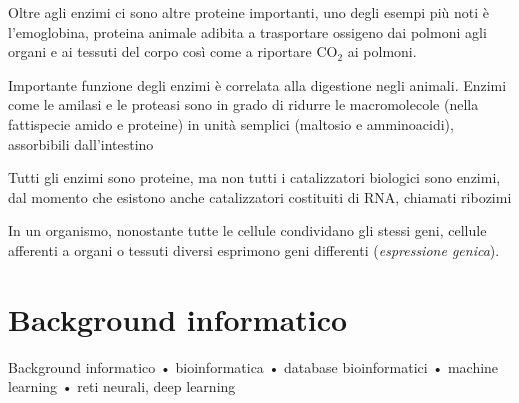 \par Oltre agli enzimi ci sono altre proteine importanti, uno degli esempi più noti è l'emoglobina, proteina animale adibita a trasportare ossigeno dai polmoni agli organi e ai tessuti del corpo così come a riportare CO$_{2}$ ai polmoni. 

Importante funzione degli enzimi è correlata alla digestione negli animali. Enzimi come le amilasi e le proteasi sono in grado di ridurre le macromolecole (nella fattispecie amido e proteine) in unità semplici (maltosio e amminoacidi), assorbibili dall'intestino

Tutti gli enzimi sono proteine, ma non tutti i catalizzatori biologici sono enzimi, dal momento che esistono anche catalizzatori costituiti di RNA, chiamati ribozimi

In un organismo, nonostante tutte le cellule condividano gli stessi geni, cellule afferenti a organi o tessuti diversi esprimono geni differenti (\textit{espressione genica}).


\section{Background informatico}

Background informatico
• bioinformatica
• database bioinformatici
• machine learning
• reti neurali, deep learning

\clearpage